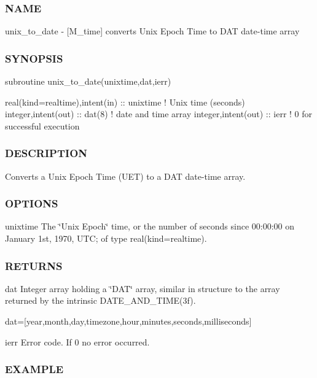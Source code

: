 \begin{DoxyVerb}
\subsubsection*{N\+A\+ME}

unix\+\_\+to\+\_\+date -\/ \mbox{[}M\+\_\+time\mbox{]} converts Unix Epoch Time to D\+AT date-\/time array 

\subsubsection*{S\+Y\+N\+O\+P\+S\+IS}

\begin{DoxyVerb}subroutine unix_to_date(unixtime,dat,ierr)

 real(kind=realtime),intent(in) :: unixtime ! Unix time (seconds)
 integer,intent(out)            :: dat(8)   ! date and time array
 integer,intent(out)            :: ierr     ! 0 for successful execution
\end{DoxyVerb}


\subsubsection*{D\+E\+S\+C\+R\+I\+P\+T\+I\+ON}

Converts a Unix Epoch Time (U\+ET) to a D\+AT date-\/time array.

\subsubsection*{O\+P\+T\+I\+O\+NS}

unixtime The \char`\"{}\+Unix Epoch\char`\"{} time, or the number of seconds since 00\+:00\+:00 on January 1st, 1970, U\+TC; of type real(kind=realtime).

\subsubsection*{R\+E\+T\+U\+R\+NS}

dat Integer array holding a \char`\"{}\+D\+A\+T\char`\"{} array, similar in structure to the array returned by the intrinsic D\+A\+T\+E\+\_\+\+A\+N\+D\+\_\+\+T\+I\+M\+E(3f).

dat=\mbox{[}year,month,day,timezone,hour,minutes,seconds,milliseconds\mbox{]}

ierr Error code. If 0 no error occurred.

\subsubsection*{E\+X\+A\+M\+P\+LE}


\end{DoxyVerb}
